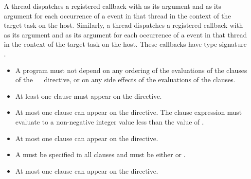 A thread dispatches a registered  callback with
 as its  argument and
 as its  argument for each occurrence
of a  event in that thread in the context of the 
target task on the host. Similarly, a thread dispatches a registered 
 callback with  as its
 argument and  as its 
argument for each occurrence of a  event in that thread
in the context of the target task on the host. These callbacks have
type signature .

\restrictions
\begin{itemize}
\item A program must not depend on any ordering of the evaluations of the clauses 
      of the ~~ directive, or on any side 
      effects of the evaluations of the clauses.
\item At least one  clause must appear on the directive.
\item At most one  clause can appear on the directive. The 
       clause expression must evaluate to a non-negative integer 
      value less than the value of .
\item At most one  clause can appear on the directive.
\item A  must be specified in all  clauses and must be 
      either  or .
\item At most one  clause can appear on the directive.
\end{itemize}

